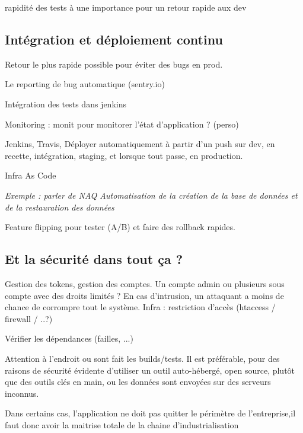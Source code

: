 rapidité des tests à une importance pour un retour rapide aux dev

\subsection{Intégration et déploiement continu}


Retour le plus rapide possible pour éviter des bugs en prod. 

Le reporting de bug automatique (sentry.io)

Intégration des tests dans jenkins

Monitoring : monit pour monitorer l'état d'application ? (perso)

Jenkins, Travis, Déployer automatiquement à partir d'un push sur dev, en recette, intégration, staging, et lorsque tout passe, en production.

Infra As Code %

\textit{Exemple : parler de NAQ Automatisation de la création de la base de données et de la restauration des données}

Feature flipping pour tester (A/B) et faire des rollback rapides.

\subsection{Et la sécurité dans tout ça ?}


Gestion des tokens, gestion des comptes.
Un compte admin ou plusieurs sous compte avec des droits limités ? En cas d'intrusion, un attaquant a moins de chance de corrompre tout le système.
Infra : restriction d'accès (htaccess / firewall / ..?)

Vérifier les dépendances (failles, ...)

Attention à l'endroit ou sont fait les builds/tests. Il est préférable, pour des raisons de sécurité évidente d'utiliser un outil auto-hébergé, open source, plutôt que des outils clés en main, ou les données sont envoyées sur des serveurs inconnus. 

Dans certains cas, l'application ne doit pas quitter le périmètre de l'entreprise,il faut donc avoir la maitrise totale de la chaine d'industrialisation
